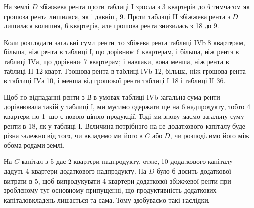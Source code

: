 
На землі $D$ збіжжева рента проти таблиці I зросла з 3
квартерів до 6
тимчасом як грошова рента лишилася, як і давніш, 9. Проти таблиці II
збіжжева рента з $D$ лишилася колишня, 6 квартерів, але грошова рента знизилась
з 18 до 9.

Коли розглядати загальні суми ренти, то збіжева рента таблиці IVb \deq{} 8
квартерам, більша, ніж рента в таблиці І, що дорівнює 6 квартерам, і більша,
ніж рента в таблиці IVа, що дорівнює 7 квартерам; і навпаки, вона менша, ніж
рента в таблиці II \deq{} 12 кварт. Грошова рента в таблиці IVb \deq{} 12,
більша, ніж грошова рента в таблиці ІVа \deq{} 10, і менша від грошової
ренти таблиці І \deq{} 18 і таблиці II \deq{} 36.

Щоб по відпаданні ренти з $В$ в умовах таблиці IVb загальна сума ренти
дорівнювала такій у таблиці I, ми мусимо одержати ще на 6
надпродукту, тобто 4 квартери по 1, що є новою ціною продукції.
Тоді ми знову маємо загальну суму ренти в 18, як у таблиці І. Величина
потрібного на це додаткового капіталу буде різна залежно від того, чи
вкладемо ми його в $C$ або $D$, чи розподілимо його між обома родами землі.

На $C$ капітал в 5 дає 2 квартери надпродукту, отже, 10
додаткового капіталу дадуть 4 квартери додаткового надпродукту. На $D$ було б
досить додаткової витрати в 5, щоб випродукувати 4 квартери додаткової
збіжжевої ренти при зробленому тут основному припущенні, що продуктивність
додаткових капіталовкладень лишається та сама. Тому здобуваємо
такі наслідки.

